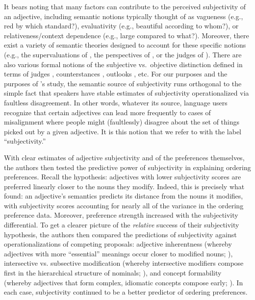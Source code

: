 \documentclass[preprint,authoryear]{elsarticle}\frenchspacing
\newcommand{\gcs}[1]{\textcolor{blue}{[gcs: #1]}}
\begin{document}
It bears noting that many factors can contribute to the perceived subjectivity of an adjective, including semantic notions typically thought of as vagueness (e.g., red by which standard?), evaluativity (e.g., beautiful according to whom?), or relativeness/context dependence (e.g., large compared to what?). Moreover, there exist a variety of semantic theories designed to account for these specific notions (e.g., the supervaluations of \citealt{kamppartee1995}, the perspectives of \citealt{kolbel2002}, or the judges of \citealt{lasersohn2005}). There are also various formal notions of the subjective vs.~objective distinction defined in terms of judges \citep{saebo2009}, counterstances \citep{kennedywiller2016}, outlooks \citep{coppock2018}, etc. For our purposes and the purposes of \citeauthor{scontrasetal2017adjectives}'s study, the semantic source of subjectivity runs orthogonal to the simple fact that speakers have stable estimates of subjectivity operationalized via faultless disagreement. In other words, whatever its source, language users recognize that certain adjectives can lead more frequently to cases of misalignment where people might (faultlessly) disagree about the set of things picked out by a given adjective. It is this notion that we refer to with the label ``subjectivity.''

With clear estimates of adjective subjectivity and of the preferences themselves, the authors then tested the predictive power of subjectivity in explaining ordering preferences. Recall the hypothesis: adjectives with lower subjectivity scores are preferred linearly closer to the nouns they modify. Indeed, this is precisely what \citeauthor{scontrasetal2017adjectives} found: an adjective's semantics predicts its distance from the nouns it modifies, with subjectivity scores accounting for nearly all of the variance in the ordering preference data. Moreover, preference strength increased with the subjectivity differential. To get a clearer picture of the \emph{relative} success of their subjectivity hypothesis, the authors then compared the predictions of subjectivity against operationalizations of competing proposals: adjective inherentness (whereby adjectives with more ``essential'' meanings occur closer to modified nouns; \citealp{sweet1898,whorf1945,ziff1960}), intersective vs. subsective modification (whereby intersective modifiers compose first in the hierarchical structure of nominals; \citealp{truswell2009}), and concept formability (whereby adjectives that form complex, idiomatic concepts compose early; \citealp{bouchard2005, mcnallyboleda2004, svenonius2008}). In each case, subjectivity continued to be a better predictor of ordering preferences.
\end{document}
